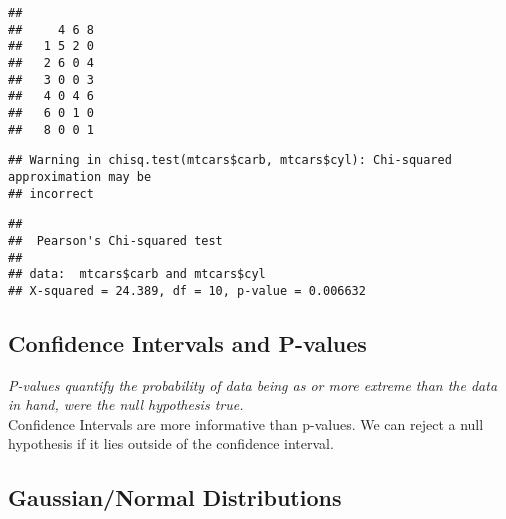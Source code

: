 \documentclass[]{article}
\newenvironment{Shaded}{\begin{snugshade}}{\end{snugshade}}
\newcommand{\CommentTok}[1]{\textcolor[rgb]{0.56,0.35,0.01}{\textit{#1}}}
\newcommand{\KeywordTok}[1]{\textcolor[rgb]{0.13,0.29,0.53}{\textbf{#1}}}
\newcommand{\NormalTok}[1]{#1}
\newcommand{\OperatorTok}[1]{\textcolor[rgb]{0.81,0.36,0.00}{\textbf{#1}}}
\newcommand{\StringTok}[1]{\textcolor[rgb]{0.31,0.60,0.02}{#1}}
\begin{document}
\begin{Shaded}
\end{Shaded}

\begin{verbatim}
##    
##     4 6 8
##   1 5 2 0
##   2 6 0 4
##   3 0 0 3
##   4 0 4 6
##   6 0 1 0
##   8 0 0 1
\end{verbatim}

\begin{Shaded}
\end{Shaded}

\begin{verbatim}
## Warning in chisq.test(mtcars$carb, mtcars$cyl): Chi-squared approximation may be
## incorrect
\end{verbatim}

\begin{verbatim}
## 
##  Pearson's Chi-squared test
## 
## data:  mtcars$carb and mtcars$cyl
## X-squared = 24.389, df = 10, p-value = 0.006632
\end{verbatim}

\hypertarget{confidence-intervals-and-p-values}{%
\subsection{Confidence Intervals and
P-values}\label{confidence-intervals-and-p-values}}

\emph{P-values quantify the probability of data being as or more extreme
than the data in hand, were the null hypothesis true.\\
}Confidence Intervals are more informative than p-values. We can reject
a null hypothesis if it lies outside of the confidence interval.

\hypertarget{gaussiannormal-distributions}{%
\subsection{Gaussian/Normal
Distributions}\label{gaussiannormal-distributions}}
\end{document}
